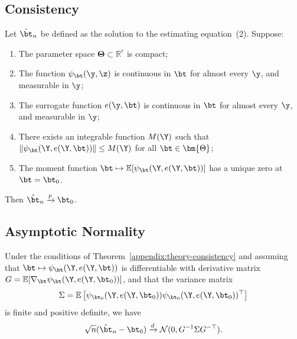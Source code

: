 \subsection{Consistency}

\begin{theorem}[Consistency]
Let $\hat\bt_n$ be defined as the solution to the estimating equation~(2). Suppose:
\begin{enumerate}
    \item The parameter space $\bm{\Theta} \subset \mathbb{R}^r$ is compact;
    \item The function $\psi_\bt(\y, \z)$ is continuous in $\bt$ for almost every $\y$, and measurable in $\y$;
    \item The surrogate function $e(\y, \bt)$ is continuous in $\bt$ for almost every $\y$, and measurable in $\y$;
    \item There exists an integrable function $M(\Y)$ such that $\|\psi_\bt(\Y, e(\Y, \bt))\| \leq M(\Y)$ for all $\bt \in \bm{\Theta}$;
    \item The moment function $\bt \mapsto \mathbb{E}[\psi_\bt(\Y, e(\Y, \bt))]$ has a unique zero at $\bt = \bt_0$.
\end{enumerate}
Then $\hat\bt_n \xrightarrow{p} \bt_0$.
\end{theorem}

\subsection{Asymptotic Normality}

\begin{theorem}
Under the conditions of Theorem~\ref{appendix:theory-consistency} and assuming that $\bt \mapsto \psi_\bt(\Y, e(\Y, \bt))$ is differentiable with derivative matrix $G = \mathbb{E}[\nabla_\bt \psi_\bt(\Y, e(\Y, \bt_0))]$, and that the variance matrix
\[
\Sigma = \mathbb{E}\left[\psi_{\bt_0}(\Y, e(\Y, \bt_0)) \psi_{\bt_0}(\Y, e(\Y, \bt_0))^\top\right]
\]
is finite and positive definite, we have
\[
\sqrt{n}(\hat\bt_n - \bt_0) \xrightarrow{d} \mathcal{N}(0, G^{-1} \Sigma G^{-\top}).
\]
\end{theorem}
